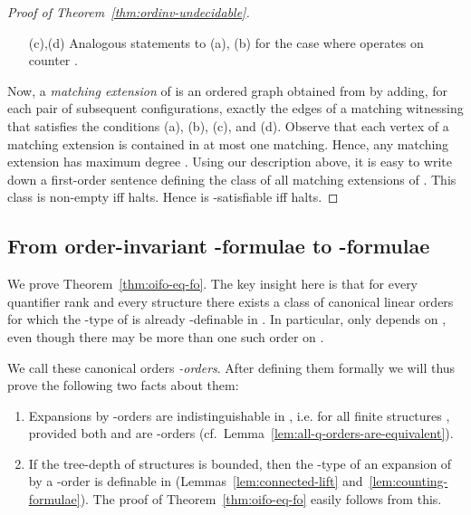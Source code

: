 \documentclass[11pt]{article}
\begin{document}
\begin{proof}[Proof of Theorem~\ref{thm:ordinv-undecidable}]
\begin{enumerate}
\begin{enumerate}
      Equivalently, either one of the following statements is true:
      \begin{itemize}
      \item There exists no -coloured vertex in
         and no -col\-oured vertex in
        . Furthermore, the -coloured vertices in
         can be matched with the -coloured
        vertices in . The unique instruction
        vertex in  is -coloured.
      \item There is at least one -coloured vertex in
        . Furthermore, the -coloured vertices in
         can be matched with all but one of the
        -coloured vertices in , and the
        -coloured vertices in  can be
        matched with the -coloured vertices in
        .
        The unique instruction vertex in  is -coloured.
      \end{itemize}
    \item[(c),(d)] Analogous statements to (a), (b) for the case where
       operates on counter .
    \end{enumerate}
  \end{enumerate}
  Now, a \emph{matching extension} of  is an ordered graph
  obtained from  by adding, for each pair of subsequent
  configurations, exactly the edges of a matching witnessing that
   satisfies the conditions (a), (b), (c), and (d). Observe
  that each vertex of a matching extension is contained in at most one
  matching. Hence, any matching extension has maximum degree .
  Using our description above, it is easy to write down a first-order
  sentence  defining the class of all matching extensions of
  . This class is non-empty iff  halts. Hence  is
  -satisfiable iff  halts.
\end{proof}

\subsection{From order-invariant -formulae to -formulae}
\label{sec:oifo-to-fo}

We prove Theorem~\ref{thm:oifo-eq-fo}. The key insight here is that for every
quantifier rank  and every structure  there exists a
class of canonical linear orders  for which the -type of
 is already -definable in . In particular,
 only depends on , even though there may be more than
one such order on .

We call these canonical orders \emph{-orders}. After defining them
formally we will thus prove the following two facts about them:
\begin{enumerate}
\item Expansions by -orders are indistinguishable in
  , i.e. 
  for all finite structures , provided both  and
   are -orders
  (cf.~Lemma~\ref{lem:all-q-orders-are-equivalent}).
\item If the tree-depth of structures is bounded, then the -type
   of an expansion of  by a -order is
  definable in  (Lemmas~\ref{lem:connected-lift}
  and~\ref{lem:counting-formulae}). The proof of
  Theorem~\ref{thm:oifo-eq-fo} easily follows from this.
\end{enumerate}
\end{document}
